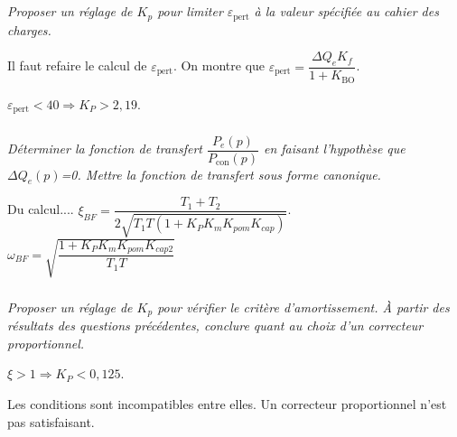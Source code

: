 \documentclass[10pt,fleqn]{article} %
\begin{document}
\begin{multicols}{2}
\subparagraph{}
\textit{Proposer un réglage de $K_p$ pour limiter $\varepsilon_{\text{pert}}$ à la valeur spécifiée au cahier des charges.}
\ifprof
\begin{corrige}
Il faut refaire le calcul de $\varepsilon_{\text{pert}}$. On montre que $\varepsilon_{\text{pert}}= \dfrac{\Delta Q_e K_f}{1+K_{\text{BO}}}$.

$\varepsilon_{\text{pert}}<40 \Rightarrow K_P >2,19$.
\end{corrige}
\else
\fi


\subparagraph{}
\textit{Déterminer la fonction de transfert $\dfrac{P_e(p)}{P_{\text{con}}(p)}$ en faisant l'hypothèse que $\Delta Q_e(p)$=0. Mettre la fonction de transfert sous forme canonique.}
\ifprof
\begin{corrige}
Du calcul....
$\xi_{BF}=\dfrac{T_1+T_2}{2\sqrt{T_1 T\left( 1+K_P K_m K_{pom}K_{cap}\right)}}$.
$\omega_{BF}=\sqrt{\dfrac{1+K_PK_m K_{pom}K_{cap2}}{T_1 T}}$
\end{corrige}
\else
\fi

\subparagraph{}
\textit{Proposer un réglage de $K_p$ pour vérifier le critère d’amortissement. \`A partir des résultats des questions précédentes, conclure quant au choix d’un correcteur proportionnel.}
\ifprof
\begin{corrige}
$ \xi > 1 \Rightarrow K_P<0,125$.

Les conditions sont incompatibles entre elles. Un correcteur proportionnel n'est pas satisfaisant.
\end{corrige}
\else
\fi

%
%
%
%
%
%
%
%
%
%


\end{multicols}
\end{document}
